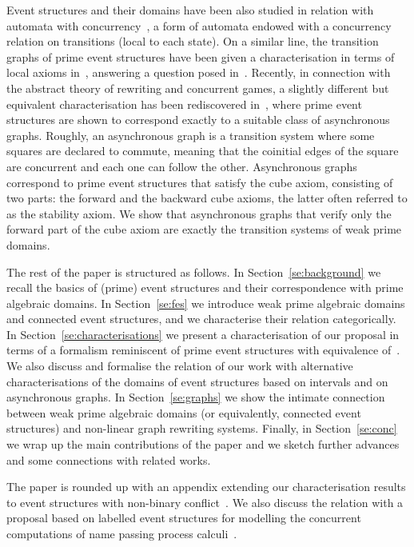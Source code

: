 \documentclass[conference]{IEEEtran}
\begin{document}
Event structures and their domains have been also studied in relation
with automata with concurrency~\cite{Dro:CAD,DK:ACRS}, 
a form of automata endowed with a concurrency relation on transitions 
(local to each state).
%
On a similar line, the transition graphs of prime event structures
have been given a characterisation in terms of local axioms
in~\cite{PU:RMC}, answering a question posed in~\cite{SNW:MFCTC}.
%
Recently, in connection with the abstract theory of rewriting and
concurrent games, a slightly different but equivalent characterisation
has been rediscovered in~\cite{Mel:hab}, where prime event structures
are shown to correspond exactly to a suitable class of
asynchronous graphs.
%
Roughly, an asynchronous graph is a transition system where some
squares are declared to commute, meaning that the coinitial edges of
the square are concurrent and each one can follow the
other. Asynchronous graphs correspond to prime event structures that
satisfy the cube axiom, consisting of two parts: the forward
and the backward cube axioms, the latter often referred to as the
stability axiom. We show that asynchronous graphs that verify only the
forward part of the cube axiom are exactly the transition systems of
weak prime domains.

The rest of the paper is structured as follows. In
Section~\ref{se:background} we recall the basics of (prime) event
structures and their correspondence with prime algebraic domains.  In
Section~\ref{se:fes} we introduce weak prime algebraic domains and
connected event structures, and we characterise their relation
categorically.  
%
In Section~\ref{se:characterisations}
we present a characterisation of our proposal 
in terms of a formalism reminiscent of prime event structures with equivalence of~\cite{win2017,VismeW19}.
% 
We also discuss and formalise the relation of our work with alternative  characterisations of the domains of event structures  based on intervals and on asynchronous graphs. 
%
In Section~\ref{se:graphs} we show the intimate connection between
weak prime algebraic domains (or equivalently, connected event
structures) and non-linear graph rewriting systems.
%
Finally, in Section~\ref{se:conc} we wrap up the main contributions of
the paper and we sketch further advances and some connections with
related works.

The paper is rounded up with an appendix extending our characterisation results
to event structures with non-binary conflict~\cite{Dro:ESD}. We also discuss the relation with a  proposal based on labelled event structures for
modelling the concurrent computations of name passing process
calculi~\cite{CVY:ESSPE}.
\end{document}
